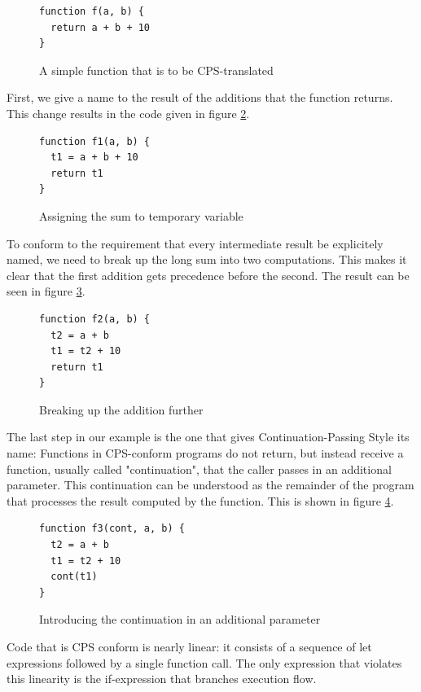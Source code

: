 \documentclass[11pt]{report}
\begin{document}
\begin{figure}[ht]
\begin{lstlisting}
function f(a, b) {
  return a + b + 10
}
\end{lstlisting}
\caption{A simple function that is to be CPS-translated}
\label{cpsconvfunc1}
\end{figure}

First, we give a name to the result of the additions that the function returns. This change results in the code given in figure \ref{cpsconvfunc2}.

\begin{figure}[ht]
\begin{lstlisting}
function f1(a, b) {
  t1 = a + b + 10
  return t1
}
\end{lstlisting}
\caption{Assigning the sum to temporary variable}
\label{cpsconvfunc2}
\end{figure}

To conform to the requirement that every intermediate result be explicitely named, we need to break up the long sum into two computations. This makes it clear that the first addition gets precedence before the second. The result can be seen in figure \ref{cpsconvfunc3}.

\begin{figure}[ht]
\begin{lstlisting}
function f2(a, b) {
  t2 = a + b
  t1 = t2 + 10
  return t1
}
\end{lstlisting}
\caption{Breaking up the addition further}
\label{cpsconvfunc3}
\end{figure}

The last step in our example is the one that gives Continuation-Passing Style its name: Functions in CPS-conform programs do not return, but instead receive a function, usually called "continuation", that the caller passes in an additional parameter. This continuation can be understood as the remainder of the program that processes the result computed by the function. This is shown in figure \ref{cpsconvfunc4}.

\begin{figure}[ht]
\begin{lstlisting}
function f3(cont, a, b) {
  t2 = a + b
  t1 = t2 + 10
  cont(t1)
}
\end{lstlisting}
\caption{Introducing the continuation in an additional parameter}
\label{cpsconvfunc4}
\end{figure}

Code that is CPS conform is nearly linear: it consists of a sequence of let expressions followed by a single function call. The only expression that violates this linearity is the if-expression that branches execution flow.
\end{document}
